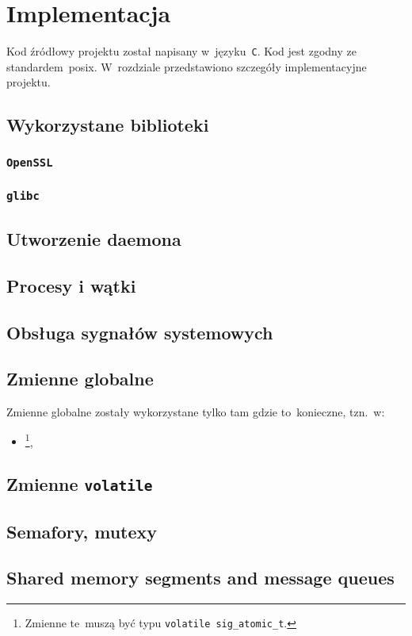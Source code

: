 \documentclass[thesis]{subfiles}
\begin{document}
\chapter{Implementacja}
\label{chapter:implementacja}

Kod źródłowy projektu został napisany w~języku~\texttt{C}. Kod jest zgodny ze standardem~\gls{posix}. W~rozdziale przedstawiono szczegóły implementacyjne projektu.

\section{Wykorzystane biblioteki}
\subsection{\texttt{OpenSSL}}
\subsection{\texttt{glibc}}
\section{Utworzenie daemona}
\section{Procesy i wątki}
\section{Obsługa sygnałów systemowych}
\section{Zmienne globalne}
\noindent Zmienne globalne zostały wykorzystane tylko tam gdzie to~konieczne, tzn.~w:
\begin{itemize}
	\item {}\footnote{Zmienne te~muszą być typu \texttt{volatile sig\_atomic\_t}.},
\end{itemize}
\section{Zmienne \texttt{volatile}}
\section{Semafory, mutexy}
\section{Shared memory segments and message queues}
\end{document}
